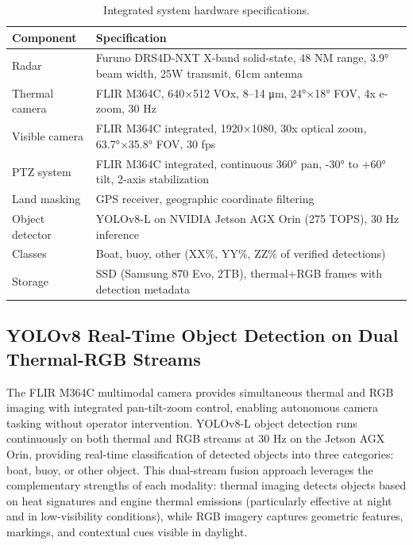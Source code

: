 \documentclass[twocolumn, 10pt]{article}
\begin{document}
\begin{table}[t]
\caption{Integrated system hardware specifications.}
\label{tab:hardware_detail}
\centering
\small
\begin{tabular}{@{}lp{5cm}@{}}
\toprule
Component & Specification \\
\midrule
Radar & Furuno DRS4D-NXT X-band solid-state, 48 NM range, 3.9° beam width, 25W transmit, 61cm antenna \\
\midrule
Thermal camera & FLIR M364C, 640×512 VOx, 8--14 μm, 24°×18° FOV, 4x e-zoom, 30 Hz \\
\midrule
Visible camera & FLIR M364C integrated, 1920×1080, 30x optical zoom, 63.7°×35.8° FOV, 30 fps \\
\midrule
PTZ system & FLIR M364C integrated, continuous 360° pan, -30° to +60° tilt, 2-axis stabilization \\
\midrule
Land masking & GPS receiver, geographic coordinate filtering \\
\midrule
Object detector & YOLOv8-L on NVIDIA Jetson AGX Orin (275 TOPS), 30 Hz inference \\
\midrule
Classes & Boat, buoy, other (XX\%, YY\%, ZZ\% of verified detections) \\
\midrule
Storage & SSD (Samsung 870 Evo, 2TB), thermal+RGB frames with detection metadata \\
\bottomrule
\end{tabular}
\end{table}

\subsection{YOLOv8 Real-Time Object Detection on Dual Thermal-RGB Streams}

The FLIR M364C multimodal camera provides simultaneous thermal and RGB imaging with integrated pan-tilt-zoom control, enabling autonomous camera tasking without operator intervention. YOLOv8-L object detection runs continuously on both thermal and RGB streams at 30 Hz on the Jetson AGX Orin, providing real-time classification of detected objects into three categories: boat, buoy, or other object. This dual-stream fusion approach leverages the complementary strengths of each modality: thermal imaging detects objects based on heat signatures and engine thermal emissions (particularly effective at night and in low-visibility conditions), while RGB imagery captures geometric features, markings, and contextual cues visible in daylight.
\end{document}

